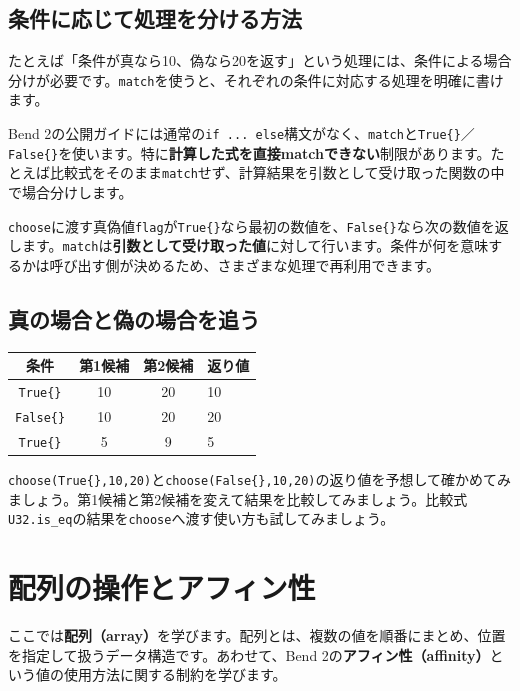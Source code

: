 \documentclass[11pt,a4paper,openany]{book}
\newcommand{\code}[1]{\texttt{#1}}
\newcommand{\term}[1]{\textbf{#1}}
\newcommand{\readcode}[2]{}
\newcommand{\exercise}[1]{\begin{exercisebox}#1\end{exercisebox}}
\begin{document}
\section{条件に応じて処理を分ける方法}
たとえば「条件が真なら10、偽なら20を返す」という処理には、条件による場合分けが必要です。\code{match}を使うと、それぞれの条件に対応する処理を明確に書けます。

Bend 2の公開ガイドには通常の\code{if ... else}構文がなく、\code{match}と\code{True\{\}}／\code{False\{\}}を使います。特に\textbf{計算した式を直接matchできない}制限があります。たとえば比較式をそのまま\code{match}せず、計算結果を引数として受け取った関数の中で場合分けします。

\readcode{27_match_basics.bend}{真偽値による場合分け（27\_match\_basics.bend）}
\code{choose}に渡す真偽値\code{flag}が\code{True\{\}}なら最初の数値を、\code{False\{\}}なら次の数値を返します。\code{match}は\textbf{引数として受け取った値}に対して行います。条件が何を意味するかは呼び出す側が決めるため、さまざまな処理で再利用できます。

\section{真の場合と偽の場合を追う}
\begin{tabularx}{\linewidth}{@{}c c c X@{}}
\toprule
条件 & 第1候補 & 第2候補 & 返り値\\
\midrule
\code{True\{\}} & 10 & 20 & 10\\
\code{False\{\}} & 10 & 20 & 20\\
\code{True\{\}} & 5 & 9 & 5\\
\bottomrule
\end{tabularx}

\exercise{\code{choose(True\{\},10,20)}と\code{choose(False\{\},10,20)}の返り値を予想して確かめてみましょう。第1候補と第2候補を変えて結果を比較してみましょう。比較式\code{U32.is\_eq}の結果を\code{choose}へ渡す使い方も試してみましょう。}

\chapter{配列の操作とアフィン性}
\begin{tcolorbox}[colback=blue!3,colframe=blue!16,boxrule=.35pt,arc=1mm,left=3mm,right=3mm,top=2mm,bottom=2mm]
\small ここでは\term{配列（array）}を学びます。配列とは、複数の値を順番にまとめ、位置を指定して扱うデータ構造です。あわせて、Bend 2の\term{アフィン性（affinity）}という値の使用方法に関する制約を学びます。
\end{tcolorbox}
\end{document}
